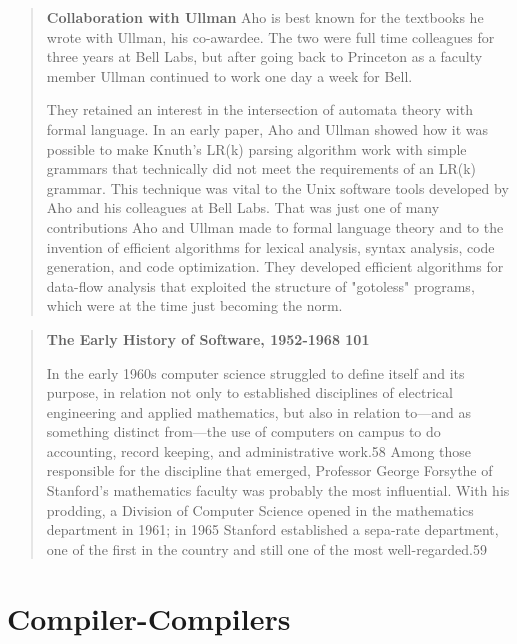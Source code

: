 \begin{quotation}
\textbf{Collaboration with Ullman}
Aho is best known for the textbooks he wrote with Ullman, his co-awardee. The 
two were full time colleagues for three years at Bell Labs, but after going 
back to Princeton as a faculty member Ullman continued to work one day a week 
for Bell.

They retained an interest in the intersection of automata theory with formal 
language. In an early paper, Aho and Ullman showed how it was possible to make 
Knuth's LR(k) parsing algorithm work with simple grammars that technically did 
not meet the requirements of an LR(k) grammar. This technique was vital to the 
Unix software tools developed by Aho and his colleagues at Bell Labs. That was 
just one of many contributions Aho and Ullman made to formal language theory 
and to the invention of efficient algorithms for lexical analysis, syntax 
analysis, code generation, and code optimization. They developed efficient 
algorithms for data-flow analysis that exploited the structure of "gotoless" 
programs, which were at the time just becoming the norm.
\cite{aho_turing_award_2020}
\end{quotation}

\begin{quotation}
\textbf{The Early History of Software, 1952-1968 101}

In the early 1960s computer science struggled to define itself and its purpose, 
in relation not only to established disciplines of electrical engineering and 
applied mathematics, but also in relation to—and as something distinct from—the 
use of computers on campus to do accounting, record keeping, and administrative 
work.58 Among those responsible for the discipline that emerged, Professor 
George Forsythe of Stanford's mathematics faculty was probably the most 
influential. With his prodding, a Division of Computer Science opened in the 
mathematics department in 1961; in 1965 Stanford established a sepa-rate 
department, one of the first in the country and still one of the most 
well-regarded.59
\cite{history_of_modern_computing_2003_ceruzzi}
\end{quotation}


\section{Compiler-Compilers}

